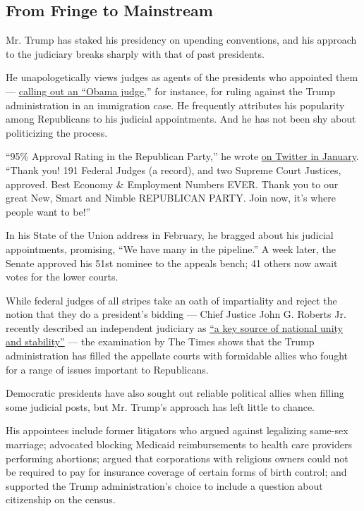 \hypertarget{from-fringe-to-mainstream}{%
\subsection{From Fringe to Mainstream}\label{from-fringe-to-mainstream}}

Mr. Trump has staked his presidency on upending conventions, and his
approach to the judiciary breaks sharply with that of past presidents.

He unapologetically views judges as agents of the presidents who
appointed them ---
\href{https://www.nytimes3xbfgragh.onion/2018/11/20/us/politics/trump-appeals-court-ninth-circuit.html}{calling
out an ``Obama judge},'' for instance, for ruling against the Trump
administration in an immigration case. He frequently attributes his
popularity among Republicans to his judicial appointments. And he has
not been shy about politicizing the process.

``95\% Approval Rating in the Republican Party,'' he wrote
\href{https://twitter.com/realdonaldtrump/status/1221469014427348992?lang=en}{on
Twitter in January}. ``Thank you! 191 Federal Judges (a record), and two
Supreme Court Justices, approved. Best Economy \& Employment Numbers
EVER. Thank you to our great New, Smart and Nimble REPUBLICAN PARTY.
Join now, it's where people want to be!''

In his State of the Union address in February, he bragged about his
judicial appointments, promising, ``We have many in the pipeline.'' A
week later, the Senate approved his 51st nominee to the appeals bench;
41 others now await votes for the lower courts.

While federal judges of all stripes take an oath of impartiality and
reject the notion that they do a president's bidding --- Chief Justice
John G. Roberts Jr. recently described an independent judiciary as
\href{https://www.supremecourt.gov/publicinfo/year-end/2019year-endreport.pdf}{``a
key source of national unity and stability''} --- the examination by The
Times shows that the Trump administration has filled the appellate
courts with formidable allies who fought for a range of issues important
to Republicans.

Democratic presidents have also sought out reliable political allies
when filling some judicial posts, but Mr. Trump's approach has left
little to chance.

His appointees include former litigators who argued against legalizing
same-sex marriage; advocated blocking Medicaid reimbursements to health
care providers performing abortions; argued that corporations with
religious owners could not be required to pay for insurance coverage of
certain forms of birth control; and supported the Trump administration's
choice to include a question about citizenship on the census.

